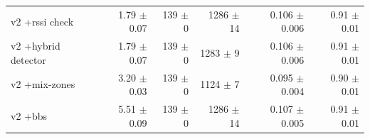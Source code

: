 \begin{table}[htbp]
{\begin{tabular}{lrrrrr}
v2 +rssi check & 1.79 $\pm$ 0.07 & 139 $\pm$ 0 & 1286 $\pm$ 14 & 0.106 $\pm$ 0.006 & 0.91 $\pm$ 0.01 \\
v2 +hybrid detector & 1.79 $\pm$ 0.07 & 139 $\pm$ 0 & 1283 $\pm$ 9 & 0.106 $\pm$ 0.006 & 0.91 $\pm$ 0.01 \\
v2 +mix-zones & 3.20 $\pm$ 0.03 & 139 $\pm$ 0 & 1124 $\pm$ 7 & 0.095 $\pm$ 0.004 & 0.90 $\pm$ 0.01 \\
v2 +bbs & 5.51 $\pm$ 0.09 & 139 $\pm$ 0 & 1286 $\pm$ 14 & 0.107 $\pm$ 0.005 & 0.91 $\pm$ 0.01 \\
\bottomrule
\end{tabular}}
\end{table}
